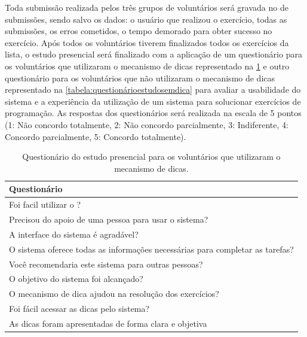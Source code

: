 Toda submissão realizada pelos três grupos de voluntários será gravada no  de submissões, sendo salvo os dados: o usuário que realizou o exercício, todas as submissões, os erros cometidos, o tempo demorado para obter sucesso no exercício. Após todos os voluntários tiverem finalizados todos os exercícios da lista, o estudo presencial será finalizado com a aplicação de um questionário para os voluntários que utilizaram o mecanismo de dicas representado na \cref{tabela:questionárioestudocomdica} e outro questionário para os voluntários que não utilizaram o mecanismo de dicas representado na \cref{tabela:questionárioestudosemdica} para avaliar a usabilidade do sistema e a experiência da utilização de um sistema  para solucionar exercícios de programação. As respostas dos questionários será realizada na escala  de 5 pontos (1: Não concordo totalmente, 2: Não concordo parcialmente, 3: Indiferente, 4: Concordo parcialmente, 5: Concordo totalmente).

\begin{table}[ht]
	\centering
	\captionsetup{justification=centering}
	\caption{Questionário do estudo presencial para os voluntários que utilizaram o mecanismo de dicas.}
	\label{tabela:questionárioestudocomdica}
	\begin{tabular}{l}
		\hline
		Questionário                        											\\ \hline
		Foi facil utilizar o \foreign{iHint}?                            				\\
		Precisou do apoio de uma pessoa para usar o sistema?                           	\\
		A interface do sistema é agradável?                        						\\
		O sistema oferece todas as informações necessárias para completar as tarefas?   \\
		Você recomendaria este sistema para outras pessoas?                           	\\
		O objetivo do sistema foi alcançado? 											\\ 
		O mecanismo de dica ajudou na resolução dos exercícios?							\\
		Foi fácil acessar as dicas pelo sistema?										\\
		As dicas foram apresentadas de forma clara e objetiva							\\ \hline
	\end{tabular}
\end{table}

